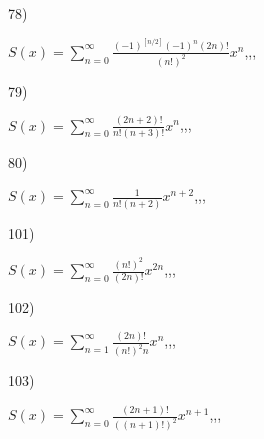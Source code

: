 \documentclass[11pt, ukrainian]{article}
\begin{document}
\par
\vspace{0.9cm}
78) \space 
{%
{$S(x)=\sum\limits_{n=0}^{\infty}{\frac{{(-1)^{[n/2]}}{(-1)^n}(2n)!}{(n!)^2}}{x^{n}}$},,, \par \smallskip  
}
\par
\vspace{0.9cm}
79) \space 
{%
{$S(x)=\sum\limits_{n=0}^{\infty}{\frac{(2n+2)!}{n!(n+3)!}}{x^{n}}$},,, \par \smallskip  
}
\par
\vspace{0.9cm}
80) \space 
{%
{$S(x)=\sum\limits_{n=0}^{\infty}{\frac{1}{n!(n+2)}}{x^{{n+2}}}$},,, \par \smallskip  
}
\par
\newpage
101) \space 
{%
{$S(x)=\sum\limits_{n=0}^{\infty}{\frac{(n!)^2}{(2n)!}}{x^{{2n}}}$},,, \par \smallskip  
}
\par
\vspace{0.9cm}
102) \space 
{%
{$S(x)=\sum\limits_{n=1}^{\infty}{\frac{(2n)!}{{(n!)^2}n}}{x^{n}}$},,, \par \smallskip  
}
\par
\vspace{0.9cm}
103) \space 
{%
{$S(x)=\sum\limits_{n=0}^{\infty}{\frac{(2n+1)!}{((n+1)!)^2}}{x^{{n+1}}}$},,, \par \smallskip  
}
\end{document}
